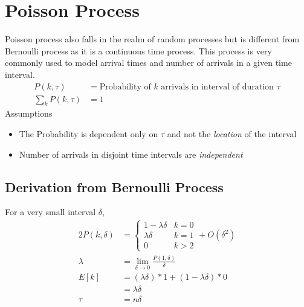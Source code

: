\documentclass[../probability-notes.tex]{subfiles}
\begin{document}
    \section{Poisson Process}
    Poisson process also falls in the realm of random processes but is different from Bernoulli process as it is a continuous time process. This process is very commonly used to model arrival times and number of arrivals in a given time interval.
    \begin{align*}
        P(k, \tau) &= \text{Probability of $k$ arrivals in interval of duration $\tau$}\\
        \sum_{k} P(k, \tau) &= 1 \tag*{for a given $\tau$}
    \end{align*}
    Assumptions
    \begin{itemize}
        \item The Probability is dependent only on $\tau$ and not the \emph{location} of the interval
        \item Number of arrivals in disjoint time intervals are \emph{independent}
    \end{itemize}
    
    \subsection{Derivation from Bernoulli Process}
    For a very small interval $\delta$,
    \begin{alignat*}{2}
        P(k, \delta) &= \begin{cases} 1-\lambda \delta &\mbox{$k = 0$}\\
                                     \lambda \delta &\mbox{$k = 1$}\\
                                     0 &\mbox{$k > 2$} \end{cases} + O(\delta^{2})\\
        \lambda &= \lim_{\delta \to 0}\frac{P(1,\delta)}{\delta} \tag*{arrival rate per unit time}\\
        E[k] &= (\lambda \delta) * 1 + (1-\lambda \delta) * 0\\
            &= \lambda \delta \\
        \tau &= n \delta
    \end{alignat*}
    
\end{document}
